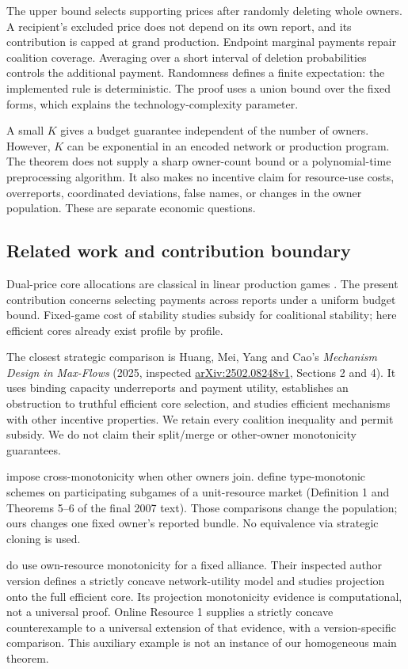 \documentclass[11pt]{article}
\theoremstyle{definition}\newtheorem{definition}[theorem]{Definition}
\theoremstyle{remark}\newtheorem{remark}[theorem]{Remark}
\begin{document}
The upper bound selects supporting prices after randomly deleting whole
owners. A recipient's excluded price does not depend on its own report, and
its contribution is capped at grand production. Endpoint marginal payments
repair coalition coverage. Averaging over a short interval of deletion
probabilities controls the additional payment. Randomness defines a finite
expectation: the implemented rule is deterministic. The proof uses a union
bound over the fixed forms, which explains the technology-complexity parameter.

A small $K$ gives a budget guarantee independent of the number of owners.
However, $K$ can be exponential in an encoded network or production program.
The theorem does not supply a sharp owner-count bound or a polynomial-time
preprocessing algorithm. It also makes no incentive claim for resource-use
costs, overreports, coordinated deviations, false names, or changes in the
owner population. These are separate economic questions.

\subsection{Related work and contribution boundary}
Dual-price core allocations are classical in linear production games
\citep{Owen,SametZemel}. The present contribution concerns selecting payments
across reports under a uniform budget bound. Fixed-game cost of stability
\citep{Bachrach} studies subsidy for coalitional stability; here efficient
cores already exist profile by profile.

The closest strategic comparison is Huang, Mei, Yang and Cao's
\emph{Mechanism Design in Max-Flows} (2025, inspected
\href{https://arxiv.org/html/2502.08248v1}{arXiv:2502.08248v1}, Sections 2 and 4).
It uses binding capacity underreports and payment utility, establishes an
obstruction to truthful efficient core selection, and studies efficient
mechanisms with other incentive properties. We retain every coalition
inequality and permit subsidy. We do not claim their split/merge or
other-owner monotonicity guarantees.

\citet{Immorlica} impose cross-monotonicity when other owners join.
\citet{Branzei} define type-monotonic schemes on participating subgames of a
unit-resource market (Definition 1 and Theorems 5--6 of the final 2007 text).
Those comparisons change the population; ours changes one fixed owner's
reported bundle. No equivalence via strategic cloning is used.

\citet{ABV} do use own-resource monotonicity for a fixed alliance. Their
inspected author version defines a strictly concave network-utility model
and studies projection onto the full efficient core. Its projection
monotonicity evidence is computational, not a universal proof. Online
Resource 1 supplies a strictly concave counterexample to a universal
extension of that evidence, with a version-specific comparison. This
auxiliary example is not an instance of our homogeneous main theorem.
\end{document}

